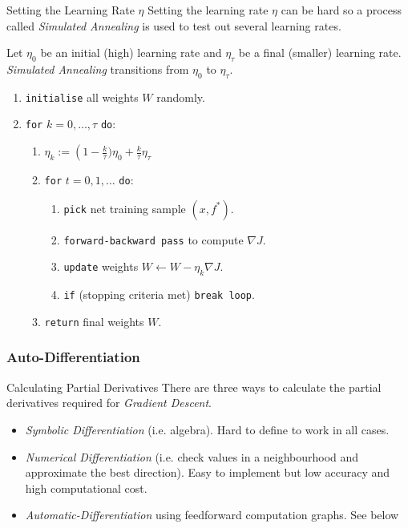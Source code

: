 \documentclass[11pt,a4paper]{article}
\begin{document}
  \begin{proposition}{Setting the Learning Rate $\eta$}
    Setting the learning rate $\eta$ can be hard so a process called \textit{Simulated Annealing} is used to test out several learning rates.
    \par Let $\eta_0$ be an initial (high) learning rate and $\eta_\tau$ be a final (smaller) learning rate. \textit{Simulated Annealing} transitions from $\eta_0$ to $\eta_\tau$.
    \begin{enumerate}
      \item \texttt{initialise} all weights $W$ randomly.
      \item \texttt{for} $k=0,\dots,\tau$ \texttt{do}:
      \begin{enumerate}
        \item $\eta_k:=\left(1-\frac{k}\tau)\eta_0+\frac{k}\tau\eta_\tau$
        \item \texttt{for} $t=0,1,\dots$ \texttt{do}:
        \begin{enumerate}
          \item \texttt{pick} net training sample $(x,f^*)$.
          \item \texttt{forward-backward pass} to compute $\nabla J$.
          \item \texttt{update} weights $W\leftarrow W-\eta_k\nabla J$.
          \item \texttt{if} (stopping criteria met) \texttt{break loop}.
        \end{enumerate}
        \item \texttt{return} final weights $W$.
      \end{enumerate}
    \end{enumerate}
  \end{proposition}

\subsubsection{Auto-Differentiation}

  \begin{proposition}{Calculating Partial Derivatives}
    There are three ways to calculate the partial derivatives required for \textit{Gradient Descent}.
    \begin{itemize}
      \item \textit{Symbolic Differentiation} (i.e. algebra). Hard to define to work in all cases.
      \item \textit{Numerical Differentiation} (i.e. check values in a neighbourhood and approximate the best direction). Easy to implement but low accuracy and high computational cost.
      \item \textit{Automatic-Differentiation} using feedforward computation graphs. See below
    \end{itemize}
  \end{proposition}
\end{document}
